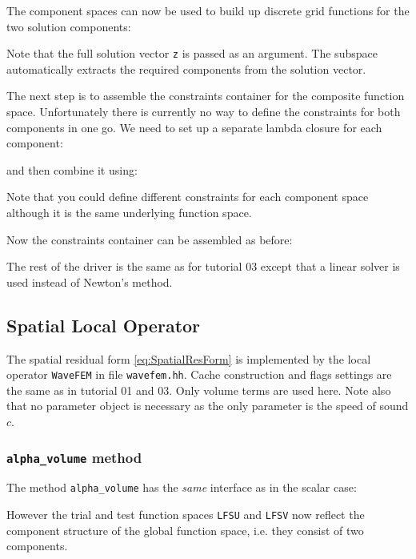 \documentclass[a4paper,12pt]{article}
\begin{document}
The component spaces can now be used to build
up discrete grid functions for the two solution components:

Note that the full solution vector \lstinline{z} is passed as an argument.
The subspace automatically extracts the required components from the solution vector.

The next step is to assemble the constraints container for the composite
function space. Unfortunately there is currently no way to define the
constraints for both components in one go. We need to
set up a separate lambda closure for each component:

and then combine it using:

Note that you could define different constraints for each component
space although it is the same underlying function space.

Now the constraints container can be assembled as before:


The rest of the driver is the same as for tutorial 03 except that
a linear solver is used instead of Newton's method.

\subsection{Spatial Local Operator}

The spatial residual form \eqref{eq:SpatialResForm} is
implemented by the local operator \lstinline{WaveFEM} in
file \lstinline{wavefem.hh}. Cache construction and flags settings
are the same as in tutorial 01 and 03. Only volume terms are used here.
Note also that no parameter object is necessary as the only parameter
is the speed of sound $c$.

\subsubsection*{\lstinline{alpha_volume} method}

The method \lstinline{alpha_volume} has the \textit{same} interface
as in the scalar case:

However the trial and test function spaces \lstinline{LFSU} and \lstinline{LFSV}
now reflect the component structure of the global function space, i.e.
they consist of two components.
\end{document}
